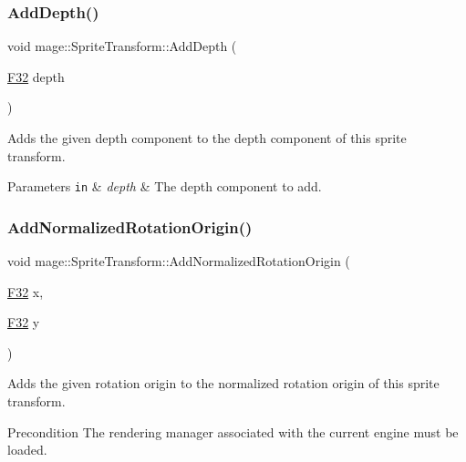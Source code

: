 \subsubsection{\texorpdfstring{Add\+Depth()}{AddDepth()}}
{\footnotesize\ttfamily void mage\+::\+Sprite\+Transform\+::\+Add\+Depth (\begin{DoxyParamCaption}\item[{\hyperlink{namespacemage_aa97e833b45f06d60a0a9c4fc22ae02c0}{F32}}]{depth }\end{DoxyParamCaption})\hspace{0.3cm}{\ttfamily [noexcept]}}

Adds the given depth component to the depth component of this sprite transform.


\begin{DoxyParams}[1]{Parameters}
\mbox{\tt in}  & {\em depth} & The depth component to add. \\
\hline
\end{DoxyParams}
\hypertarget{classmage_1_1_sprite_transform_af5b99182b93907b946df86a30bdf9e9b}{}\label{classmage_1_1_sprite_transform_af5b99182b93907b946df86a30bdf9e9b} 
\subsubsection{\texorpdfstring{Add\+Normalized\+Rotation\+Origin()}{AddNormalizedRotationOrigin()}\hspace{0.1cm}{\footnotesize\ttfamily [1/3]}}
{\footnotesize\ttfamily void mage\+::\+Sprite\+Transform\+::\+Add\+Normalized\+Rotation\+Origin (\begin{DoxyParamCaption}\item[{\hyperlink{namespacemage_aa97e833b45f06d60a0a9c4fc22ae02c0}{F32}}]{x,  }\item[{\hyperlink{namespacemage_aa97e833b45f06d60a0a9c4fc22ae02c0}{F32}}]{y }\end{DoxyParamCaption})}

Adds the given rotation origin to the normalized rotation origin of this sprite transform.

\begin{DoxyPrecond}{Precondition}
The rendering manager associated with the current engine must be loaded. 
\end{DoxyPrecond}

